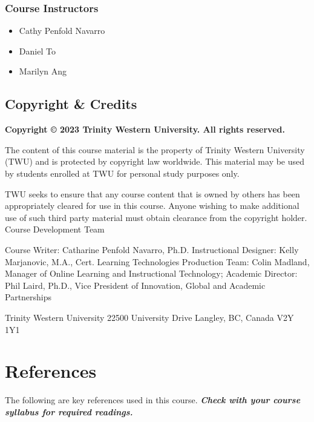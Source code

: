 \documentclass[
]{book}
\providecommand{\tightlist}{%
  \setlength{\itemsep}{0pt}\setlength{\parskip}{0pt}}
\begin{document}
\hypertarget{course-instructors}{%
\subsection*{Course Instructors}\label{course-instructors}}

\begin{itemize}
\tightlist
\item
  Cathy Penfold Navarro
\item
  Daniel To
\item
  Marilyn Ang
\end{itemize}

\hypertarget{copyright-credits}{%
\section*{Copyright \& Credits}\label{copyright-credits}}

\textbf{Copyright © 2023 Trinity Western University. All rights reserved.}

The content of this course material is the property of Trinity Western University (TWU) and is protected by copyright law worldwide. This material may be used by students enrolled at TWU for personal study purposes only.

TWU seeks to ensure that any course content that is owned by others has been appropriately cleared for use in this course. Anyone wishing to make additional use of such third party material must obtain clearance from the copyright holder.
Course Development Team

Course Writer: Catharine Penfold Navarro, Ph.D.
Instructional Designer: Kelly Marjanovic, M.A., Cert. Learning Technologies
Production Team: Colin Madland, Manager of Online Learning and Instructional Technology;
Academic Director: Phil Laird, Ph.D., Vice President of Innovation, Global and Academic Partnerships

Trinity Western University
22500 University Drive
Langley, BC, Canada \textbar{} V2Y 1Y1

\hypertarget{references-6}{%
\chapter*{References}\label{references-6}}

The following are key references used in this course. \textbf{\emph{Check with your course syllabus for required readings.}}
\end{document}
